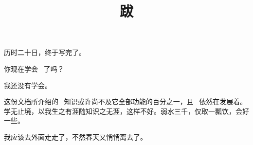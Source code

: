 \title{跋}

历时二十日，终于写完了。

你现在学会 \CONTEXT\ 了吗？

我还没有学会。

这份文档所介绍的 \CONTEXT\ 知识或许尚不及它全部功能的百分之一，且 \CONTEXT\ 依然在发展着。学无止境，以我生之有涯随知识之无涯，这样不好。弱水三千，仅取一瓢饮，会好一些。

我应该去外面走走了，不然春天又悄悄离去了。


